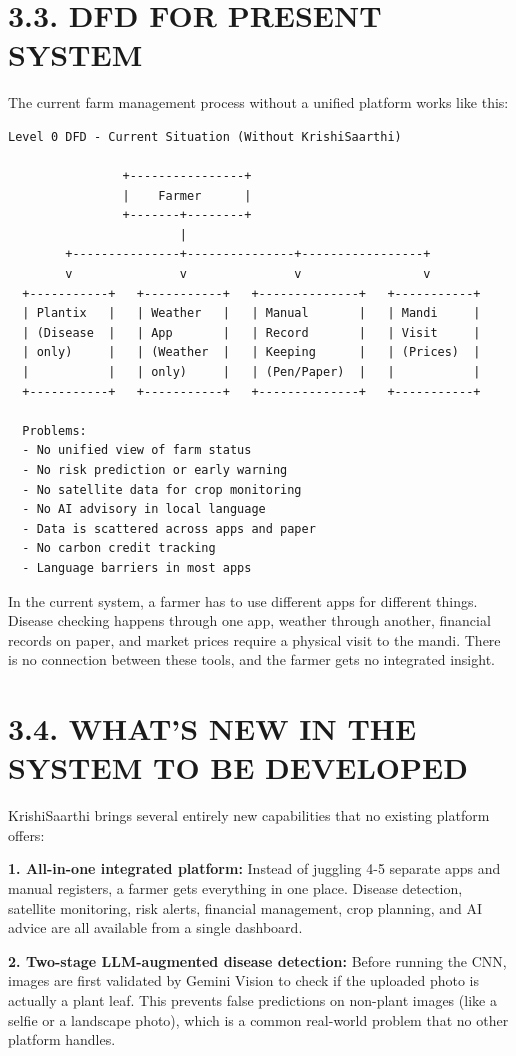 \documentclass[12pt, a4paper]{report}
\begin{document}
\section{3.3. DFD FOR PRESENT SYSTEM}
The current farm management process without a unified platform works like this:

\begin{Verbatim}[fontsize=\small]
Level 0 DFD - Current Situation (Without KrishiSaarthi)

                +----------------+
                |    Farmer      |
                +-------+--------+
                        |
        +---------------+---------------+-----------------+
        v               v               v                 v
  +-----------+   +-----------+   +--------------+   +-----------+
  | Plantix   |   | Weather   |   | Manual       |   | Mandi     |
  | (Disease  |   | App       |   | Record       |   | Visit     |
  | only)     |   | (Weather  |   | Keeping      |   | (Prices)  |
  |           |   | only)     |   | (Pen/Paper)  |   |           |
  +-----------+   +-----------+   +--------------+   +-----------+

  Problems:
  - No unified view of farm status
  - No risk prediction or early warning
  - No satellite data for crop monitoring
  - No AI advisory in local language
  - Data is scattered across apps and paper
  - No carbon credit tracking
  - Language barriers in most apps
\end{Verbatim}
In the current system, a farmer has to use different apps for different things. Disease checking happens through one app, weather through another, financial records on paper, and market prices require a physical visit to the mandi. There is no connection between these tools, and the farmer gets no integrated insight.

\section{3.4. WHAT'S NEW IN THE SYSTEM TO BE DEVELOPED}
KrishiSaarthi brings several entirely new capabilities that no existing platform offers:

\textbf{1. All-in-one integrated platform:} Instead of juggling 4-5 separate apps and manual registers, a farmer gets everything in one place. Disease detection, satellite monitoring, risk alerts, financial management, crop planning, and AI advice are all available from a single dashboard.

\textbf{2. Two-stage LLM-augmented disease detection:} Before running the CNN, images are first validated by Gemini Vision to check if the uploaded photo is actually a plant leaf. This prevents false predictions on non-plant images (like a selfie or a landscape photo), which is a common real-world problem that no other platform handles.
\end{document}
